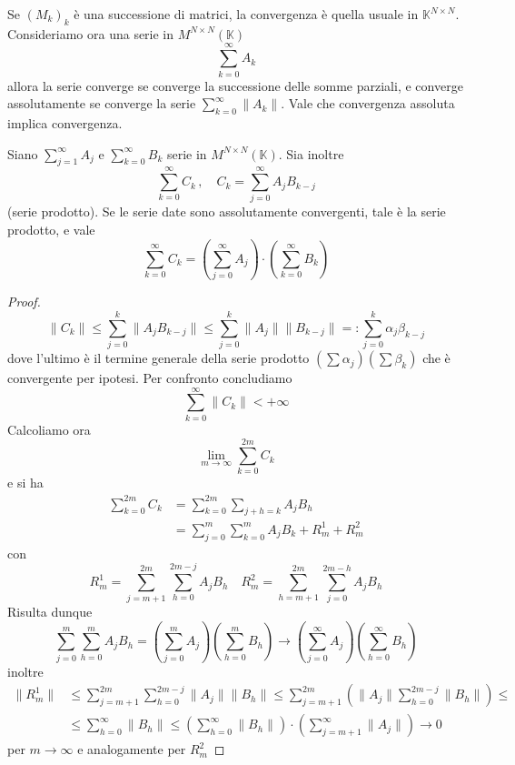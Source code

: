 Se \({(M_k)}_k\) è una successione di matrici, la convergenza è quella usuale in
\(\mathbb{K}^{N \times N}\). Consideriamo ora una serie in \(M^{N \times N}{(\mathbb{K})}\) 
\[
  \sum_{k=0}^{\infty} A_{k} 
\] allora la serie converge se converge la successione delle somme parziali, e
converge assolutamente se converge la serie \(\sum_{k=0}^{\infty} \|A_{k}\|\).
Vale che convergenza assoluta implica convergenza.

\begin{proposition}
    Siano \(\sum_{j=1}^{\infty} A_{j} \) e \(\sum_{k=0}^{\infty} B_{k} \) serie
    in \(M^{N \times N}{(\mathbb{K})}\). Sia inoltre
    \[
      \sum_{k=0}^{\infty} C_{k} \, , \quad C_{k} = \sum_{j=0}^{\infty}
      A_{j}B_{k-j}   
    \]
    (serie prodotto). Se le serie date sono assolutamente convergenti, tale è la
    serie prodotto, e vale
    \[
      \sum_{k=0}^{\infty} C_{k} = {\left( \sum_{j=0}^{\infty} A_{j}  \right)}
      \cdot {\left( \sum_{k=0}^{\infty} B_{k}  \right)}  
    \]
\end{proposition}
\begin{proof}
    \begin{equation*}
        \|C_{k}\| \le \sum_{j=0}^{k} \|A_{j}B_{k-j} \| \le \sum_{j=0}^{k}
        \|A_{j}\|\|B_{k-j} \| =: \sum_{j=0}^{k} \alpha_j \beta_{k-j}  
    \end{equation*}
    dove l'ultimo è il termine generale della serie prodotto \({\left( \sum
    \alpha_{j} \right)} {\left( \sum \beta_{k} \right)}  \) che è convergente
    per ipotesi. Per confronto concludiamo
    \[
        \sum_{k=0}^{\infty} \|C_{k}\| < +\infty 
    \]
    Calcoliamo ora 
    \[
      \lim_{m \to \infty} \sum_{k=0}^{2m}C_{k}
    \]
    e si ha 
    \begin{align*}
        \sum_{k=0}^{2m} C_{k} &= \sum_{k=0}^{2m} \sum_{j+h=k} A_{j} B_h \\
                              &= \sum_{j=0}^{m} \sum_{k=0}^{m} A_{j}B_{k} +
                              R^{1}_m + R^{2}_m 
    \end{align*}
    con
    \[
      R^{1}_m = \sum_{j=m+1}^{2m} \sum_{h=0}^{2m-j} A_{j}B_h \quad R^2_m =
      \sum_{h=m+1}^{2m} \sum_{j=0}^{2m - h} A_{j} B_h 
    \]
    Risulta dunque 
    \[
      \sum_{j=0}^{m} \sum_{h=0}^{m} A_{j}B_h = {\left( \sum_{j=0}^{m} A_{j}
      \right)} {\left( \sum_{h=0}^{m} B_h \right)} \to {\left(
              \sum_{j=0}^{\infty} A_{j} \right)} {\left( \sum_{h=0}^{\infty}
      B_{h} \right)}
    \]
    inoltre
    \begin{align*}
        \|R_{m}^{1}\| &\le \sum_{j=m+1}^{2m} \sum_{h=0}^{2m-j} \|A_{j}\|\|B_h\|
        \le \sum_{j=m+1}^{2m} {\left( \|A_{j}\| \sum_{h=0}^{2m-j} \|B_h\|
\right)} \le  \\ &\le \sum_{h=0}^{\infty} \|B_h\| \le {\left( \sum_{h=0}^\infty
\|B_h\|\right)} \cdot {\left( \sum_{j=m+1}^{\infty} \|A_{j}\|  \right)} \to 0
    \end{align*}
    per \(m \to \infty\) e analogamente per \(R^2_m\) 
\end{proof}

